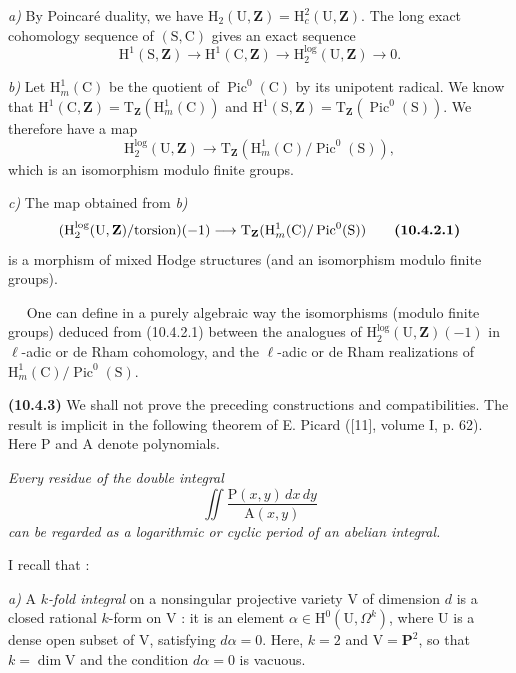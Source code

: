 \documentclass[11pt,leqno]{article}
\newcommand{\Page}[1]{\ifvmode\noindent\else\unskip\ \fi{\footnotesize\textcolor{gray}{[p.\,#1]}}\ \ignorespaces}
\begin{document}
\textit{a)} By Poincaré duality, we have \(\mathrm{H}_{2}(\mathrm{U},\mathbf{Z})=\mathrm{H}^{2}_{c}(\mathrm{U},\mathbf{Z})\). The long exact cohomology sequence of \((\mathrm{S},\mathrm{C})\) gives an exact sequence
\[
\mathrm{H}^{1}(\mathrm{S},\mathbf{Z})
\longrightarrow\mathrm{H}^{1}(\mathrm{C},\mathbf{Z})
\longrightarrow\mathrm{H}^{\log}_{2}(\mathrm{U},\mathbf{Z})
\longrightarrow0.
\]

\textit{b)} Let \(\mathrm{H}^{1}_{m}(\mathrm{C})\) be the quotient of \(\operatorname{Pic}^{0}(\mathrm{C})\) by its unipotent radical. We know that \(\mathrm{H}^{1}(\mathrm{C},\mathbf{Z})=\mathrm{T}_{\mathbf{Z}}(\mathrm{H}^{1}_{m}(\mathrm{C}))\) and \(\mathrm{H}^{1}(\mathrm{S},\mathbf{Z})=\mathrm{T}_{\mathbf{Z}}(\operatorname{Pic}^{0}(\mathrm{S}))\). We therefore have a map
\[
\mathrm{H}^{\log}_{2}(\mathrm{U},\mathbf{Z})
\longrightarrow
\mathrm{T}_{\mathbf{Z}}(\mathrm{H}^{1}_{m}(\mathrm{C})/\operatorname{Pic}^{0}(\mathrm{S})),
\]
which is an isomorphism modulo finite groups.

\textit{c)} The map obtained from \textit{b)}
\[
(\mathrm{H}^{\log}_{2}(\mathrm{U},\mathbf{Z})/\mathrm{torsion})(-1)
\longrightarrow
\mathrm{T}_{\mathbf{Z}}(\mathrm{H}^{1}_{m}(\mathrm{C})/\operatorname{Pic}^{0}(\mathrm{S}))
\tag*{\textbf{(10.4.2.1)}}
\]
is a morphism of mixed Hodge structures (and an isomorphism modulo finite groups).

\Page{76}
One can define in a purely algebraic way the isomorphisms (modulo finite groups) deduced from (10.4.2.1) between the analogues of \(\mathrm{H}^{\log}_{2}(\mathrm{U},\mathbf{Z})(-1)\) in \(\ell\)-adic or de Rham cohomology, and the \(\ell\)-adic or de Rham realizations of \(\mathrm{H}^{1}_{m}(\mathrm{C})/\operatorname{Pic}^{0}(\mathrm{S})\).

\textbf{(10.4.3)} We shall not prove the preceding constructions and compatibilities. The result is implicit in the following theorem of E. Picard ([11], volume I, p. 62). Here \(\mathrm{P}\) and \(\mathrm{A}\) denote polynomials.

\textit{Every residue of the double integral}
\[
\iint\frac{\mathrm{P}(x,y)\,dx\,dy}{\mathrm{A}(x,y)}
\]
\textit{can be regarded as a logarithmic or cyclic period of an abelian integral.}

I recall that :

\textit{a)} A \textit{\(k\)-fold integral} on a nonsingular projective variety \(\mathrm{V}\) of dimension \(d\) is a closed rational \(k\)-form on \(\mathrm{V}\) : it is an element \(\alpha\in\mathrm{H}^{0}(\mathrm{U},\Omega^{k})\), where \(\mathrm{U}\) is a dense open subset of \(\mathrm{V}\), satisfying \(d\alpha=0\). Here, \(k=2\) and \(\mathrm{V}=\mathbf{P}^{2}\), so that \(k=\dim\mathrm{V}\) and the condition \(d\alpha=0\) is vacuous.
\end{document}

